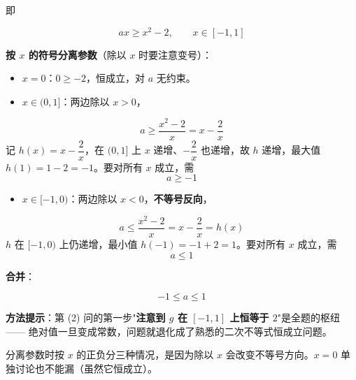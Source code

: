 \begin{answer}
即

\nopagebreak[4]
\[ax\ge x^{2}-2,\qquad x\in[-1,1]\]

\Needspace{0.25\textheight}

\textbf{按 $x$ 的符号分离参数}（除以 $x$ 时要注意变号）：

\begin{itemize}
\item \textbf{$x=0$}：$0\ge-2$，恒成立，对 $a$ 无约束。
\item \textbf{$x\in(0,1]$}：两边除以 $x>0$，
\end{itemize}
\nopagebreak[4]
\[a\ge\frac{x^{2}-2}x=x-\frac2x\]
  记 $h(x)=x-\dfrac2x$，在 $(0,1]$ 上 $x$ 递增、$-\dfrac2x$ 也递增，故 $h$ 递增，最大值 $h(1)=1-2=-1$。要对所有 $x$ 成立，需
\nopagebreak[4]
\[a\ge-1\]
\begin{itemize}
\item \textbf{$x\in[-1,0)$}：两边除以 $x<0$，\textbf{不等号反向}，
\end{itemize}
\nopagebreak[4]
\[a\le\frac{x^{2}-2}x=x-\frac2x=h(x)\]
  $h$ 在 $[-1,0)$ 上仍递增，最小值 $h(-1)=-1+2=1$。要对所有 $x$ 成立，需
\nopagebreak[4]
\[a\le1\]

\textbf{合并}：

\nopagebreak[4]
\[-1\le a\le1\]

\begin{gktip}
\textbf{方法提示}：第 (2) 问的第一步"\textbf{注意到 $g$ 在 $[-1,1]$ 上恒等于 $2$}"是全题的枢纽 —— 绝对值一旦变成常数，问题就退化成了熟悉的二次不等式恒成立问题。

分离参数时按 $x$ 的正负分三种情况，是因为除以 $x$ 会改变不等号方向。$x=0$ 单独讨论也不能漏（虽然它恒成立）。
\end{gktip}

\par\medskip



\end{answer}